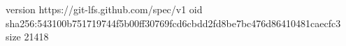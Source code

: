 version https://git-lfs.github.com/spec/v1
oid sha256:543100b751719744f5b00ff30769fcd6cbdd2fd8be7bc476d86410481caecfc3
size 21418
